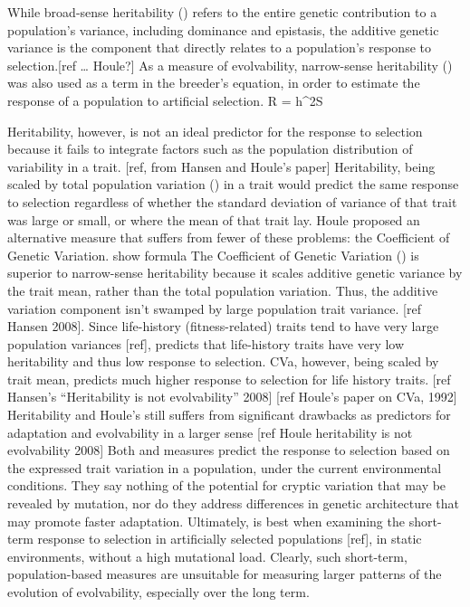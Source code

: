 While broad-sense heritability () refers to the entire genetic contribution to a population’s variance, including dominance and epistasis, the additive genetic variance is the component that directly relates to a population’s response to selection.[ref … Houle?] As a measure of evolvability, narrow-sense heritability () was also used as a term in the breeder’s equation, in order to estimate the response of a population to artificial selection.
R = {h^2}S

Heritability, however, is not an ideal predictor for the response to selection because it fails to integrate factors such as the population distribution of variability in a trait. [ref, from Hansen and Houle’s paper] Heritability, being scaled by total population variation () in a trait would predict the same response to selection regardless of whether the standard deviation of variance of that trait was large or small, or where the mean of that trait lay.
Houle proposed an alternative measure that suffers from fewer of these problems: the Coefficient of Genetic Variation.
show formula
The Coefficient of Genetic Variation () is superior to narrow-sense heritability because it scales additive genetic variance by the trait mean, rather than the total population variation. Thus, the additive variation component isn’t swamped by large population trait variance. [ref Hansen 2008]. Since life-history (fitness-related) traits tend to have very large population variances [ref], predicts that life-history traits have very low heritability and thus low response to selection. CVa, however, being scaled by trait mean, predicts much higher response to selection for life history traits. [ref  Hansen’s “Heritability is not evolvability” 2008] [ref Houle’s paper on CVa, 1992]
Heritability and Houle’s  still suffers from significant drawbacks as predictors for adaptation and evolvability in a larger sense [ref Houle heritability is not evolvability 2008] Both  and measures predict the response to selection based on the expressed trait variation in a population, under the current environmental conditions. They say nothing of the potential for cryptic variation that may be revealed by mutation, nor do they address differences in genetic architecture that may promote faster adaptation. Ultimately,  is best when examining the short-term response to selection in artificially selected populations [ref], in static environments, without a high mutational load.
Clearly, such short-term, population-based measures are unsuitable for measuring larger patterns of the evolution of evolvability, especially over the long term.
